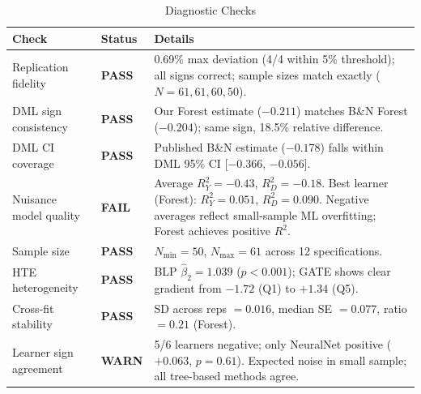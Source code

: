 \documentclass[12pt]{article}
\begin{document}
\begin{table}[H]
\centering
\caption{Diagnostic Checks}
\label{tab:diagnostics}
\small
\begin{tabular}{llp{8cm}}
\toprule
Check & Status & Details \\
\midrule
Replication fidelity & \textbf{PASS} &
  0.69\% max deviation (4/4 within 5\% threshold);
  all signs correct; sample sizes match exactly ($N = 61, 61, 60, 50$). \\
DML sign consistency & \textbf{PASS} &
  Our Forest estimate ($-0.211$) matches B\&N Forest ($-0.204$); same sign,
  18.5\% relative difference. \\
DML CI coverage & \textbf{PASS} &
  Published B\&N estimate ($-0.178$) falls within DML 95\% CI
  [$-0.366$, $-0.056$]. \\
Nuisance model quality & \textbf{FAIL} &
  Average $R^2_Y = -0.43$, $R^2_D = -0.18$.
  Best learner (Forest): $R^2_Y = 0.051$, $R^2_D = 0.090$.
  Negative averages reflect small-sample ML overfitting; Forest achieves positive $R^2$. \\
Sample size & \textbf{PASS} &
  $N_{\min} = 50$, $N_{\max} = 61$ across 12 specifications. \\
HTE heterogeneity & \textbf{PASS} &
  BLP $\hat\beta_2 = 1.039$ ($p < 0.001$); GATE shows clear
  gradient from $-1.72$ (Q1) to $+1.34$ (Q5). \\
Cross-fit stability & \textbf{PASS} &
  SD across reps $= 0.016$, median SE $= 0.077$, ratio $= 0.21$ (Forest). \\
Learner sign agreement & \textbf{WARN} &
  5/6 learners negative; only NeuralNet positive ($+0.063$, $p = 0.61$).
  Expected noise in small sample; all tree-based methods agree. \\
\bottomrule
\end{tabular}
\end{table}
\end{document}

